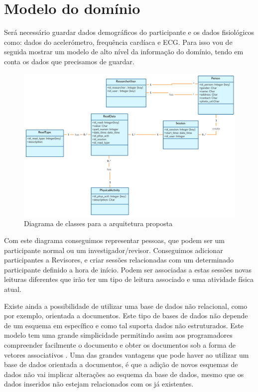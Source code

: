 \section{Modelo do domínio}
Será necessário guardar dados demográficos do participante e os dados fisiológicos como: dados do acelerómetro, frequência cardíaca e \gls{ECG}. Para isso vou de seguida mostrar um modelo de alto nível da informação do domínio, tendo em conta os dados que precisamos de guardar.

\begin{figure}[H]
  \centering
  \includegraphics[width=1\textwidth]{imgs/class-diagram.png}
  \caption[Diagrama de classes para a arquitetura proposta]{Diagrama de classes para a arquitetura proposta}
  
  \label{f:class-diagram}
\end{figure}

Com este diagrama conseguimos representar pessoas, que podem ser um participante normal ou um investigador/revisor. Conseguimos adicionar participantes a Revisores, e criar sessões relacionadas com um determinado participante definido a hora de início. Podem ser associadas a estas sessões novas leituras diferentes que irão ter um tipo de leitura associado e uma atividade física atual.
\par 
Existe ainda a possibilidade de utilizar uma base de dados não relacional, como por exemplo, orientada a documentos. Este tipo de bases de dados não depende de um esquema em específico e como tal suporta dados não estruturados. Este modelo tem uma grande simplicidade permitindo assim aos programadores compreender facilmente o documento e obter os documentos sob a forma de vetores associativos \cite{nosql}. Uma das grandes vantagens que pode haver ao utilizar um base de dados orientada a documentos, é que a adição de novos esquemas de dados não vai implicar alterações ao esquema da base de dados, mesmo que os dados inseridos não estejam relacionados com os já existentes.





